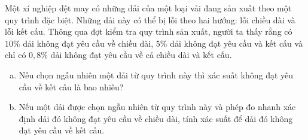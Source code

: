 \begin{bt}%
	Một xí nghiệp dệt may có những dải của một loại vải đang sản xuất theo một quy trình đặc biệt. Những dải này có thể bị lỗi theo hai hướng: lỗi chiều dài và lỗi kết cấu. Thông qua đợt kiểm tra quy trình sản xuất, người ta thấy rằng có $10\%$ dải không đạt yêu cầu về chiều dài, $5\%$ dải không đạt yêu cầu và kết cấu và chỉ có $0{,}8\%$ dải không đạt yêu cầu về cả chiều dài và kết cấu.
	\begin{enumerate}[a)]
		\item Nếu chọn ngẫu nhiên một dải từ quy trình này thì xác suất không đạt yêu cầu về kết cấu là bao nhiêu?
		\item Nếu một dải được chọn ngẫu nhiên từ quy trình này và phép đo nhanh xác định dải đó không đạt yêu cầu về chiều dài, tính xác suất để dải đó không đạt yêu cầu về kết cấu.
	\end{enumerate}
\end{bt}

